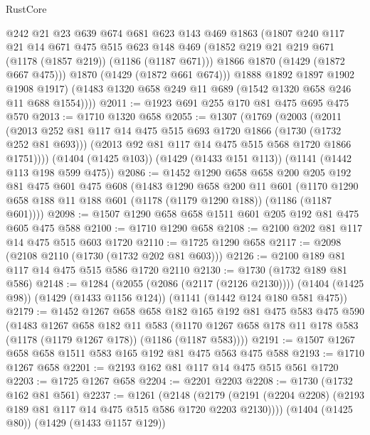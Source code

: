\begin{lexlean}{RustCore}
\begin{coremodule}
            @242
            @21
            @23
            @639
            @674
            @681
            @623
            @143
            @469
            @1863
            (@1807
              @240
              @117
              @21
              @14
              @671
              @475
              @515
              @623
              @148
              @469
              (@1852 @219 @21 @219 @671 (@1178 (@1857 @219)) (@1186 (@1187 @671)))
              @1866
              @1870
              (@1429 (@1872 @667 @475)))
            @1870
            (@1429 (@1872 @661 @674)))
          @1888
          @1892
          @1897
          @1902
          @1908
          @1917)
        (@1483 @1320 @658 @249 @11 @689 (@1542 @1320 @658 @246 @11 @688 @1554))))
@2011 := @1923 @691 @255 @170 @81 @475 @695 @475 @570
@2013 := @1710 @1320 @658
@2055 := @1307
    (@1769
      (@2003
        (@2011
          (@2013 @252 @81 @117 @14 @475 @515 @693 @1720 @1866 (@1730 (@1732 @252 @81 @693)))
          (@2013 @92 @81 @117 @14 @475 @515 @568 @1720 @1866 @1751))))
    (@1404 (@1425 @103))
    (@1429 (@1433 @151 @113))
    (@1141 (@1442 @113 @198 @599 @475))
@2086 := @1452
    @1290
    @658
    @658
    @200
    @205
    @192
    @81
    @475
    @601
    @475
    @608
    (@1483
      @1290
      @658
      @200
      @11
      @601
      (@1170 @1290 @658 @188 @11 @188 @601 (@1178 (@1179 @1290 @188)) (@1186 (@1187 @601))))
@2098 := @1507 @1290 @658 @658 @1511 @601 @205 @192 @81 @475 @605 @475 @588
@2100 := @1710 @1290 @658
@2108 := @2100 @202 @81 @117 @14 @475 @515 @603 @1720
@2110 := @1725 @1290 @658
@2117 := @2098 (@2108 @2110 (@1730 (@1732 @202 @81 @603)))
@2126 := @2100 @189 @81 @117 @14 @475 @515 @586 @1720 @2110
@2130 := @1730 (@1732 @189 @81 @586)
@2148 := @1284
    (@2055 (@2086 (@2117 (@2126 @2130))))
    (@1404 (@1425 @98))
    (@1429 (@1433 @1156 @124))
    (@1141 (@1442 @124 @180 @581 @475))
@2179 := @1452
    @1267
    @658
    @658
    @182
    @165
    @192
    @81
    @475
    @583
    @475
    @590
    (@1483
      @1267
      @658
      @182
      @11
      @583
      (@1170 @1267 @658 @178 @11 @178 @583 (@1178 (@1179 @1267 @178)) (@1186 (@1187 @583))))
@2191 := @1507 @1267 @658 @658 @1511 @583 @165 @192 @81 @475 @563 @475 @588
@2193 := @1710 @1267 @658
@2201 := @2193 @162 @81 @117 @14 @475 @515 @561 @1720
@2203 := @1725 @1267 @658
@2204 := @2201 @2203
@2208 := @1730 (@1732 @162 @81 @561)
@2237 := @1261
    (@2148 (@2179 (@2191 (@2204 @2208) (@2193 @189 @81 @117 @14 @475 @515 @586 @1720 @2203 @2130))))
    (@1404 (@1425 @80))
    (@1429 (@1433 @1157 @129))

\end{coremodule}
\end{lexlean}
